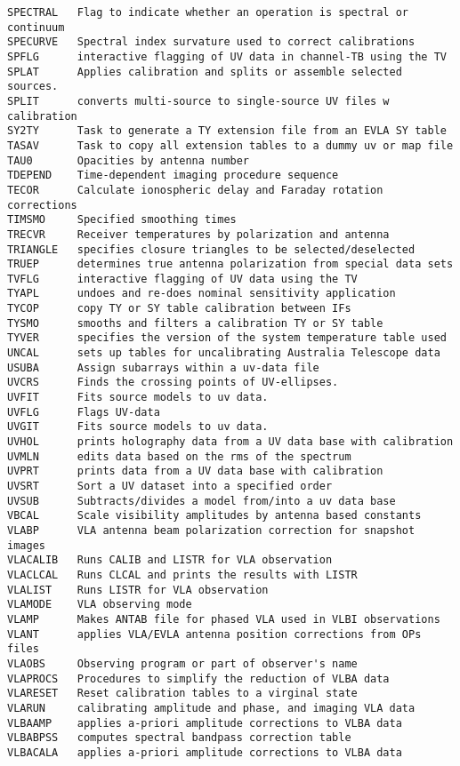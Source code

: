 \begin{verbatim}
SPECTRAL   Flag to indicate whether an operation is spectral or continuum
SPECURVE   Spectral index survature used to correct calibrations
SPFLG      interactive flagging of UV data in channel-TB using the TV
SPLAT      Applies calibration and splits or assemble selected sources.
SPLIT      converts multi-source to single-source UV files w calibration
SY2TY      Task to generate a TY extension file from an EVLA SY table
TASAV      Task to copy all extension tables to a dummy uv or map file
TAU0       Opacities by antenna number
TDEPEND    Time-dependent imaging procedure sequence
TECOR      Calculate ionospheric delay and Faraday rotation corrections
TIMSMO     Specified smoothing times
TRECVR     Receiver temperatures by polarization and antenna
TRIANGLE   specifies closure triangles to be selected/deselected
TRUEP      determines true antenna polarization from special data sets
TVFLG      interactive flagging of UV data using the TV
TYAPL      undoes and re-does nominal sensitivity application
TYCOP      copy TY or SY table calibration between IFs
TYSMO      smooths and filters a calibration TY or SY table
TYVER      specifies the version of the system temperature table used
UNCAL      sets up tables for uncalibrating Australia Telescope data
USUBA      Assign subarrays within a uv-data file
UVCRS      Finds the crossing points of UV-ellipses.
UVFIT      Fits source models to uv data.
UVFLG      Flags UV-data
UVGIT      Fits source models to uv data.
UVHOL      prints holography data from a UV data base with calibration
UVMLN      edits data based on the rms of the spectrum
UVPRT      prints data from a UV data base with calibration
UVSRT      Sort a UV dataset into a specified order
UVSUB      Subtracts/divides a model from/into a uv data base
VBCAL      Scale visibility amplitudes by antenna based constants
VLABP      VLA antenna beam polarization correction for snapshot images
VLACALIB   Runs CALIB and LISTR for VLA observation
VLACLCAL   Runs CLCAL and prints the results with LISTR
VLALIST    Runs LISTR for VLA observation
VLAMODE    VLA observing mode
VLAMP      Makes ANTAB file for phased VLA used in VLBI observations
VLANT      applies VLA/EVLA antenna position corrections from OPs files
VLAOBS     Observing program or part of observer's name
VLAPROCS   Procedures to simplify the reduction of VLBA data
VLARESET   Reset calibration tables to a virginal state
VLARUN     calibrating amplitude and phase, and imaging VLA data
VLBAAMP    applies a-priori amplitude corrections to VLBA data
VLBABPSS   computes spectral bandpass correction table
VLBACALA   applies a-priori amplitude corrections to VLBA data

\end{verbatim}
